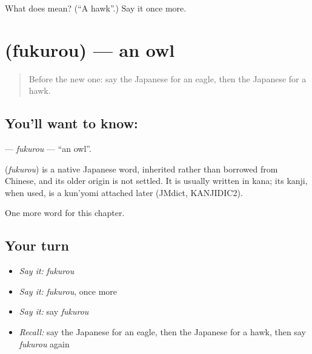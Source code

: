 \begin{tcolorbox}[breakable,colback=teal!4,colframe=teal!35!black,title={Before you move on}]
What does  mean? (\textquotedblleft{}A hawk\textquotedblright{}.) Say it once more.
\end{tcolorbox}
\section[\texorpdfstring{\ja{ふくろう} (fukurou)}{ふくろう (fukurou)}]{ (fukurou) — an owl}

\label{lesson:JA-C109-fukurou}



\begin{quote}
Before the new one: say the Japanese for an eagle, then the Japanese for a hawk.
\end{quote}

\subsection*{You'll want to know: }
\textbf{} — \emph{fukurou} — \textquotedblleft{}an owl\textquotedblright{}.

\begin{cousinweb}
\textbf{} (\emph{fukurou}) is a native Japanese word, inherited rather than borrowed from Chinese, and its older origin is not settled. It is usually written in kana; its kanji, when used, is a kun'yomi attached later (JMdict, KANJIDIC2).
\end{cousinweb}

\begin{grammarlens}[title={What you've built}]
One more word for this chapter.
\end{grammarlens}

\subsection*{Your turn}
\begin{itemize}
\raggedright
  \item \emph{Say it:} \emph{fukurou}
  \item \emph{Say it:} \emph{fukurou}, once more
  \item \emph{Say it:} say \emph{fukurou}
  \item \emph{Recall:} say the Japanese for an eagle, then the Japanese for a hawk, then say \emph{fukurou} again
\end{itemize}

